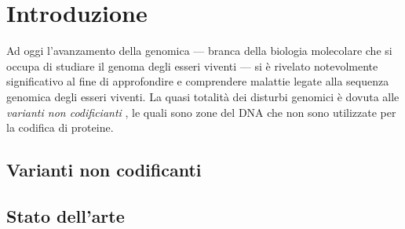 \chapter{Introduzione}\label{chp:introduction}
Ad oggi l'avanzamento della genomica — branca della biologia molecolare che si occupa di studiare il genoma degli esseri viventi — si è rivelato notevolmente significativo al fine di approfondire e comprendere malattie legate alla sequenza genomica degli esseri viventi. La quasi totalità dei disturbi genomici è dovuta alle \textsl{varianti non codificianti} , le quali sono zone del DNA che non sono utilizzate per la codifica di proteine. 



\section{Varianti non codificanti}





\section{Stato dell'arte}




